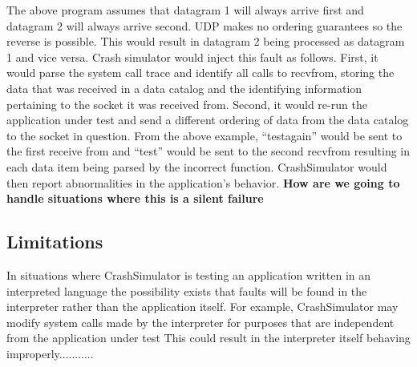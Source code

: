     The above program assumes that datagram 1 will always arrive first and datagram 2 will always arrive second. UDP
    makes no ordering guarantees so the reverse is possible. This would result in datagram 2 being processed as datagram
    1 and vice versa. Crash simulator would inject this fault as follows. First, it would parse the system call trace
    and identify all calls to recvfrom, storing the data that was received in a data catalog and the identifying
    information pertaining to the socket it was received from. Second, it would re-run the application under test and
    send a different ordering of data from the data catalog to the socket in question. From the above example,
    ``testagain'' would be sent to the first receive from and ``test'' would be sent to the second recvfrom resulting in
    each data item being parsed by the incorrect function. CrashSimulator would then report abnormalities in the
    application's behavior. \textbf{How are we going to handle situations where this is a silent failure}

    \subsection{Limitations}

    In situations where CrashSimulator is testing an application written in an interpreted language the possibility
    exists that faults will be found in the interpreter rather than the application itself. For example, CrashSimulator
    may modify system calls made by the interpreter for purposes that are independent from the application under test
    This could result in the interpreter itself behaving improperly...........
